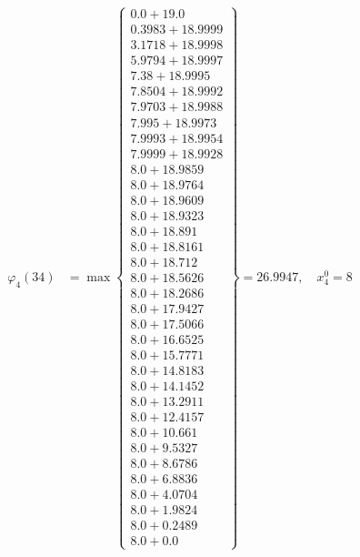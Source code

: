 \documentclass{article}
\begin{document}
\begin{align*}
\varphi_{4}(34) &= \max \left\{ \begin{array}{c}
0.0 + 19.0 \\
 0.3983 + 18.9999 \\
 3.1718 + 18.9998 \\
 5.9794 + 18.9997 \\
 7.38 + 18.9995 \\
 7.8504 + 18.9992 \\
 7.9703 + 18.9988 \\
 7.995 + 18.9973 \\
 7.9993 + 18.9954 \\
 7.9999 + 18.9928 \\
 8.0 + 18.9859 \\
 8.0 + 18.9764 \\
 8.0 + 18.9609 \\
 8.0 + 18.9323 \\
 8.0 + 18.891 \\
 8.0 + 18.8161 \\
 8.0 + 18.712 \\
 8.0 + 18.5626 \\
 8.0 + 18.2686 \\
 8.0 + 17.9427 \\
 8.0 + 17.5066 \\
 8.0 + 16.6525 \\
 8.0 + 15.7771 \\
 8.0 + 14.8183 \\
 8.0 + 14.1452 \\
 8.0 + 13.2911 \\
 8.0 + 12.4157 \\
 8.0 + 10.661 \\
 8.0 + 9.5327 \\
 8.0 + 8.6786 \\
 8.0 + 6.8836 \\
 8.0 + 4.0704 \\
 8.0 + 1.9824 \\
 8.0 + 0.2489 \\
 8.0 + 0.0
\end{array} \right\}=26.9947, \quad x_{4}^0=8\\
  

\end{align*}
\end{document}
